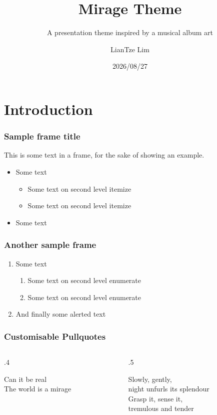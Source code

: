 \documentclass[aspectratio=1610]{beamer}
\title{Mirage Theme}
\subtitle{A presentation theme inspired by a musical album art}
\author{LianTze Lim}
\institute{(Optional) Institute Name}
\date{2026/08/27}
\begin{document}
\frame{\maketitle}

\section{Introduction}

\begin{frame}
\frametitle{Sample frame title}
This is some text in a frame, for the sake of showing an example.

\begin{itemize}
    \item Some text
    \begin{itemize}
        \item Some text on second level itemize
        \item Some text on second level itemize
    \end{itemize}
    \item Some text
\end{itemize}
\end{frame}

\begin{frame}
\frametitle{Another sample frame}
\begin{enumerate}
\item Some text
    \begin{enumerate}
        \item Some text on second level enumerate
        \item Some text on second level enumerate
    \end{enumerate}
\item And finally some \alert{alerted text}
\end{enumerate}
\end{frame}

\begin{frame}[c]
\frametitle{Customisable Pullquotes}
\begin{columns}
\begin{column}[T]{.4\textwidth}
\begin{pullquote}
    Can it be real\\
    The world is a mirage
\end{pullquote}
\end{column}

\begin{column}[T]{.5\textwidth}
\renewcommand{\MiragePullquoteOpen}{«}
\begin{pullquote}
Slowly, gently,\\
night unfurls its splendour\\
Grasp it, sense it,\\
tremulous and tender
\end{pullquote}
\end{column}
\end{columns}
\end{frame}
\end{document}
